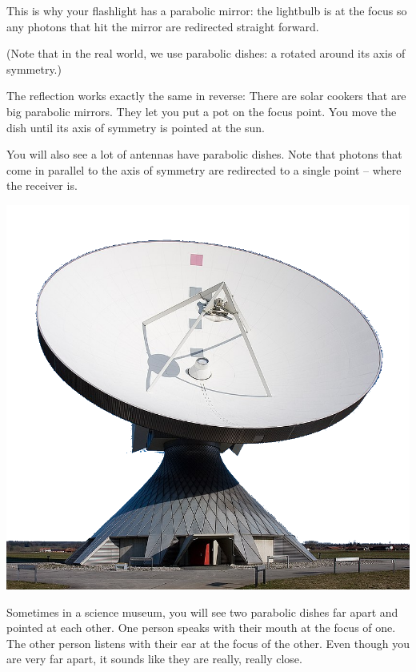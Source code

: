This is why your flashlight has a parabolic mirror: the lightbulb is
at the focus so any photons that hit the mirror are redirected
straight forward.

(Note that in the real world, we use parabolic dishes: a rotated around its axis of
symmetry.)

The reflection works exactly the same in reverse: There are solar
cookers that are big parabolic mirrors.  They let you put a pot on the
focus point.  You move the dish until its axis of symmetry is pointed
at the sun.

You will also see a lot of antennas have parabolic dishes. Note that
photons that come in parallel to the axis of symmetry are redirected
to a single point -- where the receiver is.

\includegraphics[width=0.7\linewidth]{dish.png}



Sometimes in a science museum, you will see two parabolic dishes far
apart and pointed at each other.  One person speaks with their mouth
at the focus of one.  The other person listens with their ear at the
focus of the other. Even though you are very far apart, it sounds like
they are really, really close.

